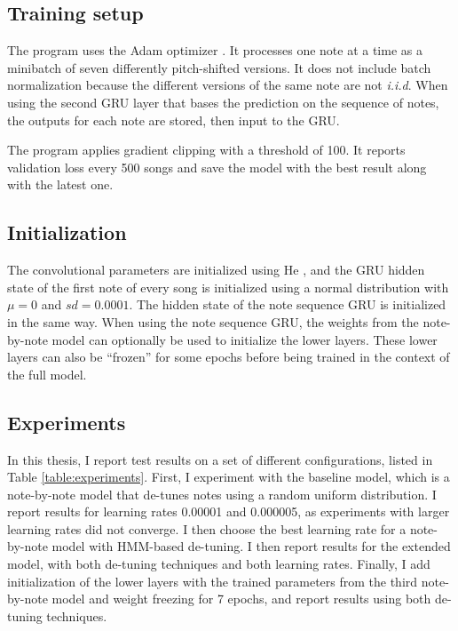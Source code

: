 \subsection{Training setup}
The program uses the Adam optimizer \cite{kingma2014adam}. It processes one note at a time as a minibatch of seven differently pitch-shifted versions. It does not include batch normalization because the different versions of the same note are not \textit{i.i.d}. When using the second GRU layer that bases the prediction on the sequence of notes, the outputs for each note are stored, then input to the GRU. 

The program applies gradient clipping \cite{pascanu2013difficulty} with a threshold of 100. It reports validation loss every 500 songs and save the model with the best result along with the latest one. 
\subsection{Initialization}
The convolutional parameters are initialized using He \cite{he2015delving}, and the GRU hidden state of the first note of every song is initialized using a normal distribution with $\mu=0$ and $sd=0.0001$. The hidden state of the note sequence GRU is initialized in the same way. When using the note sequence GRU, the weights from the note-by-note model can optionally be used to initialize the lower layers. These lower layers can also be ``frozen'' for some epochs before being trained in the context of the full model. 

\subsection{Experiments}
\label{sec:experiment-list}
In this thesis, I report test results on a set of different configurations, listed in Table \ref{table:experiments}. First, I experiment with the baseline model, which is a note-by-note model that de-tunes notes using a random uniform distribution. I report results for learning rates 0.00001 and 0.000005, as experiments with larger learning rates did not converge. I then choose the best learning rate for a note-by-note model with HMM-based de-tuning. I then report results for the extended model, with both de-tuning techniques and both learning rates. Finally, I add initialization of the lower layers with the trained parameters from the third note-by-note model and weight freezing for 7 epochs, and report results using both de-tuning techniques. 

